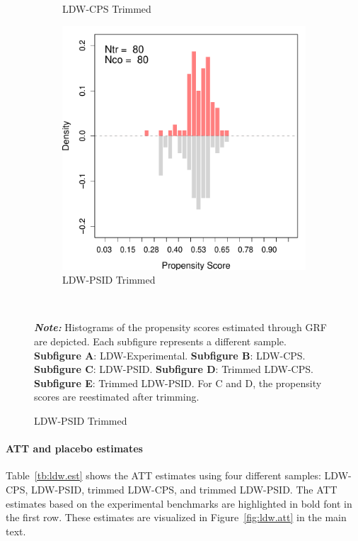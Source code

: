\documentclass[letterpaper,12pt,leqno]{article}
\begin{document}
\begin{figure}[!ht]
\begin{minipage}[c]{.65\textwidth}
\begin{subfigure}{0.45\linewidth}
            \caption{LDW-CPS Trimmed}
        \end{subfigure}
        \begin{subfigure}{0.45\linewidth}
            \includegraphics[width=\linewidth]{ps_ldw_psid_trim.pdf}
            \caption{LDW-PSID Trimmed}
        \end{subfigure}
    \end{minipage}%
    \\\raggedright
     {\footnotesize\textbf{\textit{Note:}} Histograms of the propensity scores estimated through GRF are depicted. Each subfigure represents a different sample. \textbf{Subfigure A}: LDW-Experimental. \textbf{Subfigure B}: LDW-CPS. \textbf{Subfigure C}: LDW-PSID. \textbf{Subfigure D}: Trimmed LDW-CPS. \textbf{Subfigure E}: Trimmed LDW-PSID. For C and D, the propensity scores are reestimated after trimming.}
\end{figure}
\FloatBarrier
\clearpage

\paragraph{ATT and placebo estimates} Table~\ref{tb:ldw.est} shows the ATT estimates using four different samples: LDW-CPS, LDW-PSID, trimmed LDW-CPS, and trimmed LDW-PSID. The ATT estimates based on the experimental benchmarks are highlighted in bold font in the first row. These estimates are visualized in Figure~\ref{fig:ldw.att} in the main text.
\end{document}
